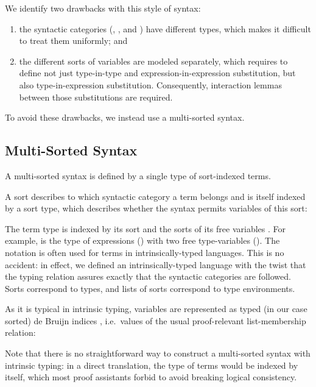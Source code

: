 \documentclass[a4paper, UKenglish, cleveref, autoref, thm-restate]{lipics-v2021}
\newenvironment{LibCode*}{%
  \begin{tcolorbox}[%
    colframe=white,%
    boxrule=0.0pt,%
    top=2.5pt,%
    left=2.5pt,%
    bottom=2.5pt,%
    right=2.5pt,%
    before skip=5pt,%
    after skip=5pt,%
    boxsep=0pt%
  ]
}{%
  \end{tcolorbox}%
}
\newcommand*\LibCode[1]{\begin{LibCode*}{#1}\end{LibCode*}}
\newcommand*\AppCode[1]{{#1}}
\newcommand*\ACode[1]{\AgdaFontStyle{\textcolor{mygray}{#1}}}
\newcommand*\ACon[1]{\AgdaInductiveConstructor{#1}}
\begin{document}
  We identify two drawbacks with this style of syntax:
  \begin{enumerate}
  \item
    the syntactic categories (\ACode{\ACon{Kind}},
    \ACode{\ACon{Type}}, and \ACode{\ACon{Expr}})
    have different types, which makes it difficult to treat them uniformly; and
  \item the different sorts of variables are modeled separately, which requires to define not just
    type-in-type and expression-in-expression substitution, but also type-in-expression substitution.
    Consequently, interaction lemmas between those substitutions are required.
  \end{enumerate}
  To avoid these drawbacks, we instead use a multi-sorted syntax.

  \subsection{Multi-Sorted Syntax}
  \label{sec:syntax:multi}
  A multi-sorted syntax is defined by a single type of sort-indexed terms.

  A sort describes to which syntactic category a term belongs and is
  itself indexed by a sort type, which describes whether the syntax
  permits variables of this sort:
  \LibCode\KSortTy
  \AppCode\FSort
  
  The term type \ACode{S \ACon{⊢} s} is indexed by its sort
  \ACode{s} and the sorts of its free variables \ACode{S}.
  For example, \ACode{\ACon{[𝕥, 𝕥] ⊢ 𝕖}} is the type of expressions
  (\ACode{\ACon{𝕖}}) with two free type-variables (\ACode{\ACon{𝕥}}).
  \AppCode\FSyntax
  The notation \ACode{\ACon{\_⊢\_}} is often used for terms in
  intrinsically-typed languages. This is no accident: in effect, we
  defined an intrinsically-typed language with the twist that the
  typing relation assures exactly that the syntactic categories are followed.
  Sorts \ACode{s} correspond to types, and lists of sorts \ACode{S}
  correspond to type environments.

  As it is typical in intrinsic typing, variables are represented as
  typed (in our case sorted) de Bruijn indices \ACode{S \ACon{∋} s}, i.e.\
  values of the usual proof-relevant list-membership relation:
  \LibCode\KVariables

  Note that there is no straightforward way to construct a
  multi-sorted syntax with intrinsic typing: in a direct translation,
  the type of terms \ACode{\ACon{\_⊢\_}} would be indexed by itself, which
  most proof assistants forbid to avoid breaking logical consistency.
\end{document}
